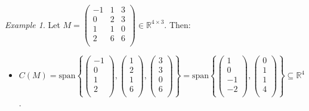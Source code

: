\documentclass{article}
\theoremstyle{remark}
\newtheorem{example}[theorem]{Example}
\newcommand\spans{\mathrm{span}}
\begin{document}
    \begin{example} Let $M=\begin{pmatrix}-1&1&3\\0&2&3\\1&1&0\\2&6&6\\\end{pmatrix}\in\mathbb{R}^{4\times3}$. Then:
        \begin{itemize}
            \item $C(M)=\spans\left\{\begin{pmatrix}-1\\0\\1\\2\\\end{pmatrix},\begin{pmatrix}1\\2\\1\\6\\\end{pmatrix},\begin{pmatrix}3\\3\\0\\6\\\end{pmatrix}\right\}=\spans\left\{\begin{pmatrix}1\\0\\-1\\-2\\\end{pmatrix},\begin{pmatrix}0\\1\\1\\4\\\end{pmatrix}\right\}\subseteq\mathbb{R}^4$.

\end{itemize}
\end{example}
\end{document}
